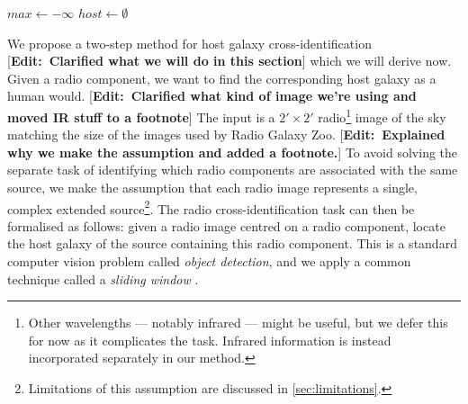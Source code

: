 \documentclass[fleqn,usenatbib,usedcolumn]{mnras}
\newcommand{\edit}[1]{ {\color{red}[{\bf Edit:~{#1}}]} }
\begin{document}
    \begin{algorithm}

        $max \leftarrow -\infty$\;
        $host \leftarrow \emptyset$\;

        \caption{\edit{Added this algorithm to clarify the approach.} Cross-identifying a radio component given an image of the component, a catalogue of infrared candidate host galaxies and a binary classifier.}
        \label{alg:xid}
    \end{algorithm}

    We propose a two-step method for host galaxy cross-identification \edit{Clarified what we will do in this section} which we will derive now. Given a radio component, we want to find the corresponding host galaxy as a human would. \edit{Clarified what kind of image we're using and moved IR stuff to a footnote} The input is a $2' \times 2'$ radio\footnote{Other wavelengths --- notably infrared --- might be useful, but we defer this for now as it complicates the task. Infrared information is instead incorporated separately in our method.} image of the sky matching the size of the images used by Radio Galaxy Zoo. \edit{Explained why we make the assumption and added a footnote.} To avoid solving the separate task of identifying which radio components are associated with the same source, we make the assumption that each radio image represents a single, complex extended source\footnote{Limitations of this assumption are discussed in \autoref{sec:limitations}.}. The radio cross-identification task can then be formalised as follows: given a radio image centred on a radio component, locate the host galaxy of the source containing this radio component. This is a standard computer vision problem called \emph{object detection}, and we apply a common technique called a \emph{sliding window} \citep{rowley1996facedetection}.
\end{document}
